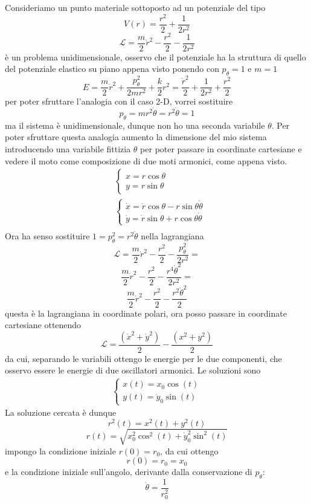 \documentclass[
10pt, %
a4paper, %
oneside, %
headinclude,footinclude, %
BCOR5mm, %
]{scrartcl}
\begin{document}
\begin{esempio}
	Consideriamo un punto materiale sottoposto ad un potenziale del tipo
	\[V(r) = \frac{r^2}{2}+\frac{1}{2r^2}\]
	\[\mathcal{L} = \frac{m}{2}\dot{r}^2-\frac{r^2}{2}-\frac{1}{2r^2}\]
	è un problema unidimensionale, osservo che il potenziale ha la struttura di quello del potenziale elastico su piano appena visto ponendo con \(p_\theta = 1\) e \(m = 1\)
	\[E = \frac{m}{2}\dot{r}^2+\frac{p^2_\theta}{2mr^2}+\frac{k}{2}r^2 = \frac{\dot{r}^2}{2}+\frac{1}{2r^2}+\frac{r^2}{2}\]
	per poter sfruttare l'analogia con il caso 2-D, vorrei sostituire 
	\[p_\theta = mr^2\dot{\theta} = r^2\dot{\theta} =1\]
	ma il sistema è unidimensionale, dunque non ho una seconda variabile \(\theta\). Per poter sfruttare questa analogia aumento la dimensione del mio sistema introducendo una variabile fittizia $\theta$ per poter passare in coordinate cartesiane e vedere il moto come composizione di due moti armonici, come appena visto.
	\begin{align*}
		&\begin{cases}
			x = r\cos\theta\\
			y = r\sin\theta
		\end{cases}\\
		&\begin{cases}
			\dot{x} = \dot{r}\cos\theta-r\sin\theta\dot{\theta}\\
			\dot{y} = \dot{r}\sin\theta+r\cos\theta\dot{\theta}
		\end{cases}\\
	\end{align*}
	Ora ha senso sostituire \(1 = p^2_\theta = r^2\dot{\theta}\) nella lagrangiana
	\[\mathcal{L} = \frac{m}{2}\dot{r}^2-\frac{r^2}{2}-\frac{p^2_\theta}{2r^2}=\]
	\[\frac{m}{2}\dot{r}^2-\frac{r^2}{2}-\frac{r^4\dot{\theta}^2}{2r^2}= \]
	\[\frac{m}{2}\dot{r}^2-\frac{r^2}{2}-\frac{r^2\dot{\theta}^2}{2}\]
	questa è la lagrangiana in coordinate polari, ora posso passare in coordinate cartesiane ottenendo
	\[\mathcal{L} = \frac{(\dot{x}^2+\dot{y}^2)}{2}-\frac{(x^2+y^2)}{2}\]
	da cui, separando le variabili ottengo le energie per le due componenti, che osservo essere le energie di due oscillatori armonici. Le soluzioni sono
	\begin{align*}
		\begin{cases}
			x(t) = x_0\cos(t)\\
			y(t) =\dot{y}_0\sin(t)
		\end{cases}
	\end{align*}
	La soluzione cercata è dunque
	\[r^2(t) = x^2(t)+y^2(t)\]
	\[r(t) = \sqrt{x_0^2\cos^2(t)+\dot{y}_0^2\sin^2(t)}\]
	impongo la condizione iniziale \(r(0)=r_0\), da cui ottengo
	\[r(0) = r_0=x_0\]
	e la condizione iniziale sull'angolo, derivante dalla conservazione di \(p_\theta\):
	\[\dot{\theta} = \frac{1}{r_0^2}\]
\end{esempio}
\end{document}
